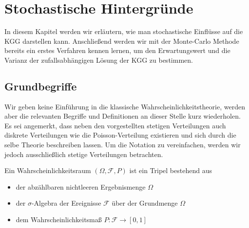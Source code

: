 
\chapter{Stochastische Hintergründe}
In diesem Kapitel werden wir erläutern, wie man stochastische Einflüsse auf die KGG darstellen kann. Anschließend werden wir mit der Monte-Carlo Methode bereits ein erstes Verfahren kennen lernen, um den Erwartungswert und die Varianz der zufallsabhängigen Lösung der KGG zu bestimmen.


\section{Grundbegriffe}
Wir geben keine Einführung in die klassische Wahrscheinlichkeitstheorie, werden aber die relevanten Begriffe und Definitionen an dieser Stelle kurz wiederholen. Es sei angemerkt, dass neben den vorgestellten stetigen Verteilungen auch diskrete Verteilungen wie die Poisson-Verteilung existieren und sich durch die selbe Theorie beschreiben lassen. Um die Notation zu vereinfachen, werden wir jedoch ausschließlich stetige Verteilungen betrachten.

\begin{mathdef}[Wahrscheinlichkeitsraum]
Ein Wahrscheinlichkeitsraum $(\Omega,\mathcal{F},P)$ ist ein Tripel bestehend aus 
\begin{itemize}
\item der abzählbaren nichtleeren Ergebnismenge $\Omega$
\item der $\sigma$-Algebra der Ereignisse $\mathcal{F}$ über der Grundmenge $\Omega$
\item dem Wahrscheinlichkeitsmaß $P\colon\mathcal{F}\to [0,1]$
\end{itemize}
\end{mathdef}

